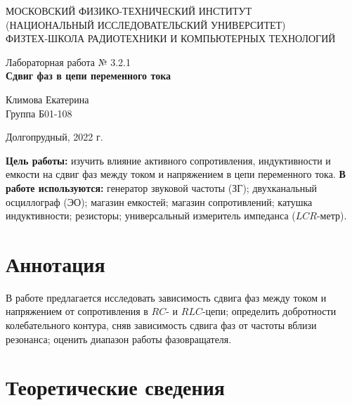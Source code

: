 \documentclass[a4paper,12pt]{article} %
\begin{document}
\begin{center}
	\footnotesize{МОСКОВСКИЙ ФИЗИКО-ТЕХНИЧЕСКИЙ ИНСТИТУТ\\(НАЦИОНАЛЬНЫЙ 			ИССЛЕДОВАТЕЛЬСКИЙ УНИВЕРСИТЕТ)}\\
	\footnotesize{ФИЗТЕХ-ШКОЛА РАДИОТЕХНИКИ И КОМПЬЮТЕРНЫХ ТЕХНОЛОГИЙ\\}
	\hfill \break
	\hfill \break
	\hfill \break
	\hfill \break
	\hfill \break
	\hfill \break
\end{center}

\begin{center}   
    \hfill \break
	\hfill \break
	\hfill \break
	\hfill \break
	\hfill \break
	\hfill \break
	\hfill \break
	\hfill \break
	\hfill \break
	\hfill \break
	\hfill \break
	\large{Лабораторная работа № 3.2.1\\\large{\textbf{Сдвиг фаз в цепи переменного тока}}}\\
	\hfill \break
	\hfill \break
	\hfill \break
	\hfill \break
	\hfill \break
	\hfill \break
	\hfill \break
	\hfill \break
	\hfill \break
	\hfill \break
	\hfill \break
	\begin{flushright}
		Климова Екатерина\\
		Группа Б01-108
	\end{flushright}
	\hfill \break
\end{center}
\hfill \break
\hfill \break
\begin{center}
	Долгопрудный, 2022 г.
\end{center}
\thispagestyle{empty}

\newpage
\hfill \break
\textbf{Цель работы:} изучить влияние активного сопротивления, индуктивности и емкости на сдвиг фаз между током и напряжением в цепи переменного тока.
\hfill \break
\hfill \break
\textbf{В работе используются:} генератор звуковой частоты (ЗГ); двухканальный осциллограф (ЭО); магазин емкостей; магазин сопротивлений; катушка индуктивности; резисторы; универсальный измеритель импеданса ($LCR$-метр).

\section{Аннотация}
\hfill \break В работе предлагается исследовать зависимость сдвига фаз между током и напряжением от сопротивления в $RC$- и $RLC$-цепи; определить добротности колебательного контура, сняв зависимость сдвига фаз от частоты вблизи резонанса; оценить диапазон работы фазовращателя.

\section{Теоретические сведения}
\end{document}
